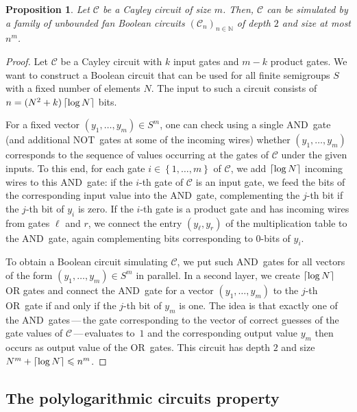 \documentclass[11pt]{article}
\numberwithin{equation}{section}
\newtheorem{proposition}[theorem]{Proposition}
\theoremstyle{definition}
\theoremstyle{plain}
\newcommand{\C}{\mathbb C}
\newcommand{\N}{\mathbb N}
\renewcommand{\leq}{\leqslant}
\renewcommand{\le}{\leq}
\newcommand{\ceil}[1]{\ensuremath\left\lceil#1\right\rceil}
\newcommand{\os}[1]{\ensuremath{\left\{#1\right\}}}
\renewcommand{\C}{\ensuremath{\mathcal{C}}}
\newcommand{\SPLCP}{polylogarithmic circuits property}
\begin{document}
\begin{proposition}
  Let $\C$ be a Cayley circuit of size $m$.
  Then, $\C$ can be simulated by a family of unbounded fan Boolean circuits
  $(\C_n)_{n \in \N}$ of depth $2$ and size at most $n^m$.
  \label{prop:simulation}
\end{proposition}

\begin{proof}
  Let $\C$ be a Cayley circuit with $k$ input gates and $m-k$ product gates.
  We want to construct a Boolean circuit that can be used for all finite
  semigroups $S$ with a fixed number of elements $N$.
  The input to such a circuit consists of $n = (N^2 + k) \ceil{\log N}$ bits.

  For a fixed vector $(y_1, \dots, y_m) \in S^m$, one can check using a single
  AND~gate (and additional NOT~gates at some of the incoming wires) whether
  $(y_1, \dots, y_m)$ corresponds to the sequence of values occurring at the
  gates of $\C$ under the given inputs.
  To this end, for each gate $i \in \os{1, \dots, m}$ of $\C$, we add
  $\ceil{\log N}$ incoming wires to this AND~gate:
  if the $i$-th gate of $\C$ is an input gate, we feed the bits of the
  corresponding input value into the AND~gate, complementing the $j$-th bit if
  the $j$-th bit of $y_i$ is zero.
  If the $i$-th gate is a product gate and has incoming wires from gates $\ell$
  and $r$, we connect the entry $(y_\ell, y_r)$ of the multiplication table to
  the AND~gate, again complementing bits corresponding to 0-bits of $y_i$.

  To obtain a Boolean circuit simulating $\C$, we put such AND~gates for all
  vectors of the form $(y_1, \dots, y_m) \in S^m$ in parallel. In a second
  layer, we create $\ceil{\log N}$ OR gates and connect the AND~gate for a
  vector $(y_1, \dots, y_m)$ to the $j$-th OR~gate if and only if the $j$-th
  bit of $y_m$ is one.
  The idea is that exactly one of the AND~gates\,---\,the gate corresponding to
  the vector of correct guesses of the gate values of $\C$\,---\,evaluates
  to~$1$ and the corresponding output value $y_m$ then occurs as output value
  of the OR~gates.
  This circuit has depth $2$ and size $N^m + \ceil{\log N} \le n^m$.
\end{proof}

%
\subsection{The {\SPLCP}}    %
\end{document}
